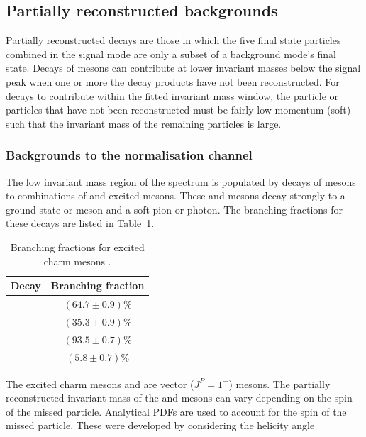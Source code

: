 \subsection{Partially reconstructed backgrounds}
\label{sec:B2DsKK_partrecocomps}

Partially reconstructed decays are those in which the five final state particles combined in the signal mode are only a subset of a background mode's final state.
Decays of \B mesons can contribute at lower invariant masses below the signal peak when one or more the decay products have not been reconstructed. 
For decays to contribute within the fitted \Bp invariant mass window, the particle or particles that have not been reconstructed must be fairly low-momentum (soft) such that the invariant mass of the remaining particles is large.

\subsubsection{Backgrounds to the normalisation channel}

The low invariant mass region of the \Dsp\Dzb spectrum is populated by decays of \Bp mesons to combinations of \D and excited \D mesons. These \Dstarzb and \Dss mesons decay strongly to a ground state \Dzb or \Dsp meson and a soft pion or photon. The branching fractions for these decays are listed in Table~\ref{tab:dstar_BFs}.


\begin{table}[h]
\centering
\caption{Branching fractions for excited charm mesons \cite{PDG2016}. } 
\label{tab:dstar_BFs}
\begin{tabular}{ l c }

\hline
Decay                           & Branching fraction \\ 
\hline
\decay{\Dstarzb}{\Dzb\Pgamma}   &   $(64.7\pm0.9)\%$ \\
\decay{\Dstarzb}{\Dzb\piz}      &   $(35.3\pm0.9)\%$ \\
\decay{\Dssp}{\Dsp\Pgamma}      &   $(93.5\pm0.7)\%$ \\
\decay{\Dssp}{\Dsp\piz}         &    $(5.8\pm0.7)\%$ \\
\hline

\end{tabular}  
\end{table}

The excited charm mesons \Dstarzb and  are vector ($J^{P} = 1^{-}$) mesons. The partially reconstructed invariant mass of the \Dsp and \Dzb mesons can vary depending on the spin of the missed particle.
Analytical PDFs are used to account for the spin of the missed particle. These were developed by considering the helicity angle 




